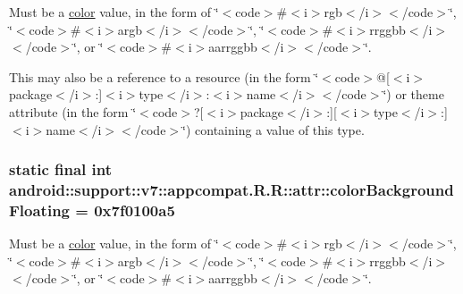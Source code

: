 Must be a \hyperlink{classandroid_1_1support_1_1v7_1_1appcompat_1_1_r_1_1color}{color} value, in the form of \char`\"{}$<$code$>$\#$<$i$>$rgb$<$/i$>$$<$/code$>$\char`\"{}, \char`\"{}$<$code$>$\#$<$i$>$argb$<$/i$>$$<$/code$>$\char`\"{}, \char`\"{}$<$code$>$\#$<$i$>$rrggbb$<$/i$>$$<$/code$>$\char`\"{}, or \char`\"{}$<$code$>$\#$<$i$>$aarrggbb$<$/i$>$$<$/code$>$\char`\"{}. 

This may also be a reference to a resource (in the form \char`\"{}$<$code$>$@\mbox{[}$<$i$>$package$<$/i$>$:\mbox{]}$<$i$>$type$<$/i$>$:$<$i$>$name$<$/i$>$$<$/code$>$\char`\"{}) or theme attribute (in the form \char`\"{}$<$code$>$?\mbox{[}$<$i$>$package$<$/i$>$:\mbox{]}\mbox{[}$<$i$>$type$<$/i$>$:\mbox{]}$<$i$>$name$<$/i$>$$<$/code$>$\char`\"{}) containing a value of this type. \hypertarget{classandroid_1_1support_1_1v7_1_1appcompat_1_1_r_1_1attr_5fac3ace1c5e84c142e7f95b01f8db5b}{
\subsubsection[{colorBackgroundFloating}]{\setlength{\rightskip}{0pt plus 5cm}static final int android::support::v7::appcompat.R.R::attr::colorBackgroundFloating = 0x7f0100a5}}
\label{classandroid_1_1support_1_1v7_1_1appcompat_1_1_r_1_1attr_5fac3ace1c5e84c142e7f95b01f8db5b}


Must be a \hyperlink{classandroid_1_1support_1_1v7_1_1appcompat_1_1_r_1_1color}{color} value, in the form of \char`\"{}$<$code$>$\#$<$i$>$rgb$<$/i$>$$<$/code$>$\char`\"{}, \char`\"{}$<$code$>$\#$<$i$>$argb$<$/i$>$$<$/code$>$\char`\"{}, \char`\"{}$<$code$>$\#$<$i$>$rrggbb$<$/i$>$$<$/code$>$\char`\"{}, or \char`\"{}$<$code$>$\#$<$i$>$aarrggbb$<$/i$>$$<$/code$>$\char`\"{}. 

